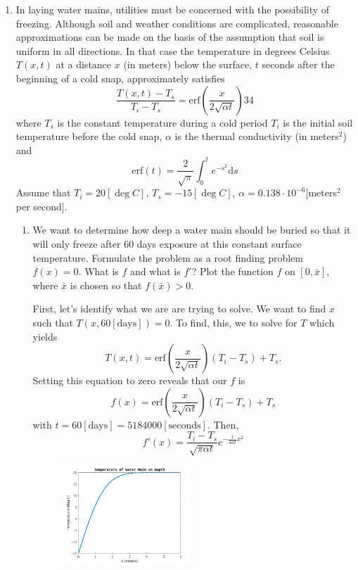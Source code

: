 \documentclass[a4paper,12pt]{article}
\newcommand{\erf}{\mathrm{erf}}
\newcommand{\dd}{\mathrm{d}}
\begin{document}
\begin{enumerate}[label = \arabic*.]
		\item In laying water mains, utilities must be concerned with the possibility of freezing. Although soil and weather conditions are complicated, reasonable approximations can be made on the basis of the assumption that soil is uniform in all directions.  In that case the temperature in degrees Celsius $ T(x,t) $ at a distance $ x $ (in meters) below the surface, $ t $ seconds after the beginning of a cold snap, approximately satisfies
		\[
			\frac{T(x,t) - T_s}{T_i - T_s} = \erf\left(\frac{x}{2\sqrt{\alpha t}}\right)34
		\]
		where $ T_s $ is the constant temperature during a cold period $ T_i $ is the initial soil temperature before the cold snap, $ \alpha $ is the thermal conductivity (in meters$ ^2 $) and 
		\[
			\erf(t) = \frac{2}{\sqrt{\pi}} \int_0^t e^{-s^2}\dd s
		\]
		Assume that $ T_i = 20 [\deg C]$, $ T_s = -15 [\deg C] $, $ \alpha = 0.138 \cdot 10^{-6} [$meters$ ^2 $ per second$ ] .$
        \begin{enumerate}[label = \roman*.]
            \item We want to determine how deep a water main should be buried so that it will only freeze after 60 days exposure at this constant surface temperature. Formulate the problem as a root finding problem $ f(x) = 0. $ What is $ f $ and what is $ f' $? Plot the function $ f $ on $ [0, \bar{x}] $, where $ \bar{x} $ is chosen so that $ f(\bar{x}) > 0 $. 
            
            First, let's identify what we are are trying to solve. We want to find $ x $ such that $ T(x, 60 [\text{days}]) = 0 $. To find, this, we to solve for $ T $ which yields
            \[
                T(x,t) = \erf\left(\frac{x}{2\sqrt{\alpha t}}\right) (T_i - T_s) + T_s.
            \]
            Setting this equation to zero reveals that our $ f $ is 
            \[
                f(x) = \erf\left(\frac{x}{2\sqrt{\alpha t}}\right) (T_i - T_s) + T_s
            \]
            with $ t = 60 [\text{days}] = 5184000 [\text{seconds}] $. Then,
            \[
                f'(x) = \frac{T_i - T_s}{\sqrt{\pi \alpha t}} e^{-\frac{1}{4 \alpha t} x^2}
            \]
            \begin{figure}[h!]
                \centering
                \includegraphics[width = 0.5\textwidth]{"images/WaterTemp.png"}
            \end{figure}
        

\end{enumerate}
\end{enumerate}
\end{document}
